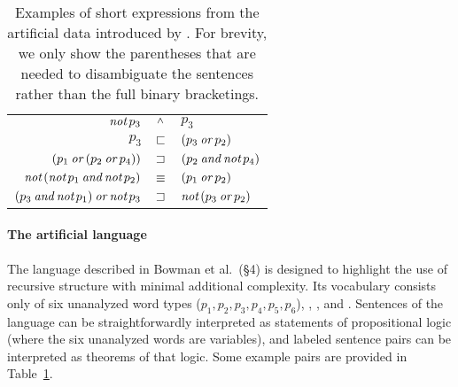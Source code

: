 \begin{table}[tp]
  \centering\small
    \begin{tabular}[t]{r c l}
      \toprule
      $\mathop{\textit{not}} p_3$        & $\mathbin{^{\wedge}}$ & $p_3$ \\
      $p_3$               & $\sqsubset$ & $(p_3 \mathbin{\textit{or}} p_2)$ \\
      $(p_1 \mathbin{\textit{or}} (p_2 \mathbin{\textit{or}} p_4))$               & $\sqsupset$ & $(p_2 \mathbin{\textit{and}}  \mathop{\textit{not}} p_4)$ \\
      $\mathop{\textit{not}}\, (\mathop{\textit{not}} p_1 \mathbin{\textit{and}} \mathop{\textit{not}} p_2)$ & $\equiv$ & $(p_1 \mathbin{\textit{or}} p_2)$ \\ 
      $(p_3 \mathbin{\textit{and}} \mathop{\textit{not}} p_1 ) \mathbin{\textit{or}} \mathop{\textit{not}} p_3$    & $\sqsupset$& $\mathop{\textit{not}}\, (p_3 \mathbin{\textit{or}} p_2)$ \\
      \bottomrule
    \end{tabular}
    \caption{Examples of short expressions from the artificial data introduced by \protect\citealt{Bowman:Potts:Manning:2014}. For brevity, we only show the parentheses that are needed to disambiguate the sentences rather than the full binary bracketings.}\label{tab:plexs}
\end{table}


\paragraph{The artificial language} The language described in Bowman et al.~(\S4) is designed to highlight the use of recursive structure with minimal additional complexity. Its vocabulary consists only of six unanalyzed word types ($p_1, p_2, p_3, p_4, p_5, p_6$), , , and . Sentences of the language can be straightforwardly interpreted as statements of propositional logic (where the six unanalyzed words are variables), and labeled sentence pairs can be interpreted as theorems of that logic. Some example pairs are provided in Table~\ref{tab:plexs}.

